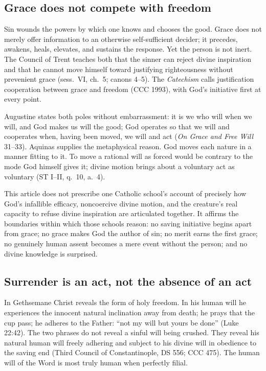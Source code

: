 \subsection{Grace does not compete with freedom}

Sin wounds the powers by which one knows and chooses the good. Grace does not merely offer information to an otherwise self-sufficient decider; it precedes, awakens, heals, elevates, and sustains the response. Yet the person is not inert. The Council of Trent teaches both that the sinner can reject divine inspiration and that he cannot move himself toward justifying righteousness without prevenient grace (sess.~VI, ch.~5; canons 4--5). The \emph{Catechism} calls justification cooperation between grace and freedom (CCC 1993), with God's initiative first at every point.

Augustine states both poles without embarrassment: it is we who will when we will, and God makes us will the good; God operates so that we will and cooperates when, having been moved, we will and act (\emph{On Grace and Free Will} 31--33). Aquinas supplies the metaphysical reason. God moves each nature in a manner fitting to it. To move a rational will as forced would be contrary to the mode God himself gives it; divine motion brings about a voluntary act as voluntary (ST I--II, q.~10, a.~4).

This article does not prescribe one Catholic school's account of precisely how God's infallible efficacy, noncoercive divine motion, and the creature's real capacity to refuse divine inspiration are articulated together. It affirms the boundaries within which those schools reason: no saving initiative begins apart from grace; no grace makes God the author of sin; no merit earns the first grace; no genuinely human assent becomes a mere event without the person; and no divine knowledge is surprised.

\subsection{Surrender is an act, not the absence of an act}

In Gethsemane Christ reveals the form of holy freedom. In his human will he experiences the innocent natural inclination away from death; he prays that the cup pass; he adheres to the Father: ``not my will but yours be done'' (Luke 22:42). The two phrases do not reveal a sinful will being crushed. They reveal his natural human will freely adhering and subject to his divine will in obedience to the saving end (Third Council of Constantinople, DS 556; CCC 475). The human will of the Word is most truly human when perfectly filial.

